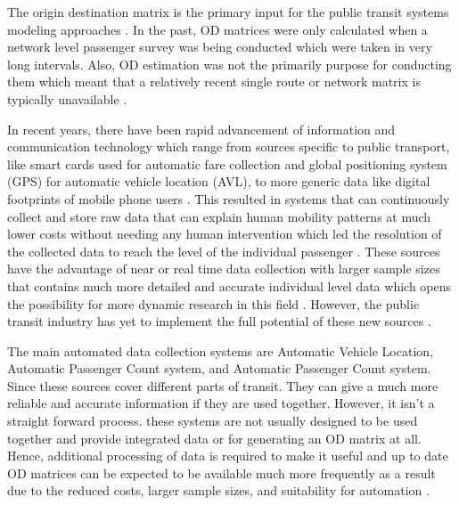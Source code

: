 \documentclass[11pt,twoside]{article}
\numberwithin{equation}{section}
\newcommand{\?}{\stackrel{?}{=}}
\begin{document}
The origin destination matrix is the primary input for the public transit systems modeling approaches \citep{wongEstimationOrigindestinationMatrices2005}. In the past, OD matrices were only calculated when a network level passenger survey was being conducted which were taken in very long intervals. Also, OD estimation was not the primarily purpose for conducting them \citep{ben-akivaDATAFUSIONMETHODS1989} which meant that a relatively recent single route or network matrix is typically unavailable \citep{cuiBusPassengerOriginDestination2006}. 

In recent years, there have been rapid advancement of information and communication technology which range from sources specific to public transport, like smart cards used for automatic fare collection and global positioning system (GPS) for automatic vehicle location (AVL), to more generic data like digital footprints of mobile phone users \citep{zannatEmergingBigData2019}. This resulted in systems that can continuously collect and store raw data that can explain human mobility patterns at much lower costs without needing any human intervention \citep{cuiBusPassengerOriginDestination2006}  which led the resolution of the collected data to reach the level of the individual passenger \citep{nassirTransitStopLevelOrigin2011}. These sources have the advantage of near or real time data collection with larger sample sizes that contains much more detailed and accurate individual level data which opens the possibility for more dynamic research in this field \citep{zannatEmergingBigData2019}. However, the public transit industry has yet to implement the full potential of these new sources \citep{cuiBusPassengerOriginDestination2006}. 


The main automated data collection systems are Automatic Vehicle Location,  Automatic Passenger Count system, and  Automatic Passenger Count system. Since these sources cover different parts of transit. They can give a much more reliable and accurate information if they are used together. However, it isn't a straight forward process. these systems are not usually designed to be used together and provide integrated data or for generating an OD matrix at all. Hence, additional processing of data is required to make it useful \citep{zhaoPlanningAnalysisImplications2004} and up to date OD matrices can be expected to be available much more frequently as a result due to the reduced costs, larger sample sizes, and suitability for automation \citep{cuiBusPassengerOriginDestination2006}. 
\end{document}
